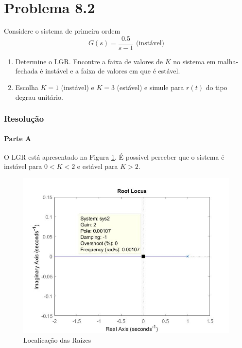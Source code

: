 \documentclass[
]{book}
\providecommand{\tightlist}{%
  \setlength{\itemsep}{0pt}\setlength{\parskip}{0pt}}
\theoremstyle{definition}
\theoremstyle{definition}
\theoremstyle{definition}
\theoremstyle{remark}
\begin{document}
\hypertarget{problema-8.2}{%
\section*{Problema 8.2}\label{problema-8.2}}

Considere o sistema de primeira ordem
\[
G(s) = \frac{0.5}{s-1} \text{ (instável)}
\]

\begin{enumerate}
\def\labelenumi{\alph{enumi}.}
\tightlist
\item
  Determine o LGR. Encontre a faixa de valores de \(K\) no sistema em malha-fechada é instável e a faixa de valores em que é estável.
\item
  Escolha \(K=1\) (instável) e \(K=3\) (estável) e simule para \(r(t)\) do tipo degrau unitário.
\end{enumerate}

\hypertarget{resoluuxe7uxe3o-23}{%
\subsubsection*{Resolução}\label{resoluuxe7uxe3o-23}}

\hypertarget{parte-a-10}{%
\paragraph{Parte A}\label{parte-a-10}}

O LGR está apresentado na Figura \ref{fig:fig8R4}. É possivel perceber que o sistema é instável para \(0 < K < 2\) e estável para \(K > 2\).

\begin{figure}

{\centering \includegraphics{Imagens/Lab8/Resolução/fig4} 

}

\caption{Localicação das Raízes}\label{fig:fig8R4}
\end{figure}
\end{document}
